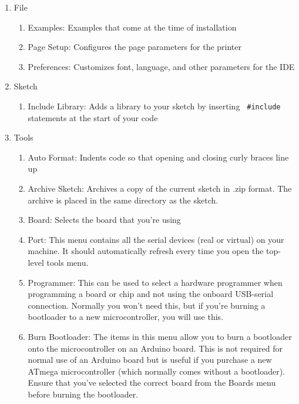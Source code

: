 \begin{enumerate}
      \item File
            \begin{enumerate}
                  \item Examples: Examples that come at the time of installation
                  \item Page Setup: Configures the page parameters for the printer
                  \item Preferences: Customizes font, language, and other parameters for
                        the IDE
            \end{enumerate}
      \item Sketch
            \begin{enumerate}
                  \item Include Library: Adds a library to your sketch by inserting {\tt
                                    \#include} statements at the start of your code
            \end{enumerate}
      \item Tools
            \begin{enumerate}
                  \item Auto Format: Indents code so that opening and closing curly
                        braces line up
                  \item Archive Sketch: Archives a copy of the current sketch in .zip
                        format. The archive is placed in the same directory as the sketch.
                  \item Board: Selects the board that you're using
                  \item Port: This menu contains all the serial devices (real or
                        virtual) on your machine. It should automatically refresh every time
                        you open the top-level tools menu.
                  \item Programmer: This can be used to select a hardware programmer when programming a board or chip and not using the onboard USB-serial
                        connection. Normally you won't need this, but if you're burning a
                        bootloader to a new microcontroller, you will use this.
                  \item Burn Bootloader: The items in this menu allow you to burn a
                        bootloader onto the microcontroller on an Arduino board. This is not
                        required for normal use of an Arduino board but is useful if you
                        purchase a new ATmega microcontroller (which normally comes without a
                        bootloader). Ensure that you've selected the correct board from the
                        Boards menu before burning the bootloader.
            \end{enumerate}
\end{enumerate}

